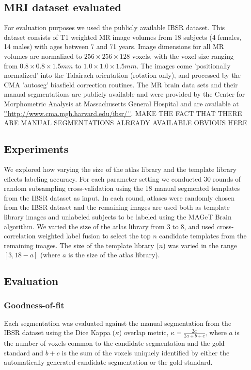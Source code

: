\documentclass{article}
\begin{document}
\subsection{MRI dataset evaluated}

For evaluation purposes we used the publicly available IBSR dataset.  This
dataset consists of T1 weighted MR image volumes from 18 subjects (4 females,
14 males) with ages between 7 and 71 years. Image dimensions for all MR volumes
are normalized to  $256  \times 256 \times 128$ voxels, with the voxel size
ranging from $0.8 \times 0.8 \times 1.5 mm$ to $1.0 \times 1.0 \times 1.5 mm$.
The images come 'positionally normalized' into the Talairach orientation
(rotation only), and processed by the CMA 'autoseg' biasfield correction
routines. The MR brain data sets and their manual segmentations are publicly
available and were provided by the Center for Morphometric Analysis at
Massachusetts General Hospital and are available at
\url{''http://www.cma.mgh.harvard.edu/ibsr/''}. {MAKE THE FACT THAT THERE ARE MANUAL SEGMENTATIONS ALREADY AVAILABLE OBVIOUS HERE}

\subsection{Experiments}

We explored how varying the size of the atlas library and the template library
effects labeling accuracy.  For each parameter setting we conducted 30 rounds
of random subsampling cross-validation using the 18 manual segmented templates
from the IBSR dataset as input. In each round, atlases were randomly chosen
from the IBSR dataset and the remaining images are used both as template
library images and unlabeled subjects to be labeled using the MAGeT Brain
algorithm.  We varied the size of the atlas library from 3 to 8, and used
cross-correlation weighted label fusion to select the top $n$ candidate
templates from the remaining images.  The size of the template library ($n$)
was varied in the range $[3, 18-a]$ (where $a$ is the size of the atlas
library).

\subsection{Evaluation}
\subsubsection{Goodness-of-fit}
Each segmentation was evaluated against the manual segmentation from the IBSR
dataset using the Dice Kappa ($\kappa$) overlap metric, $\kappa =
\frac{2a}{2a+b+c}$, where $a$ is the number of voxels common to the candidate
segmentation and the gold standard and $b+c$ is the sum of the voxels uniquely
identified by either the automatically generated candidate segmentation or the
gold-standard.
\end{document}
